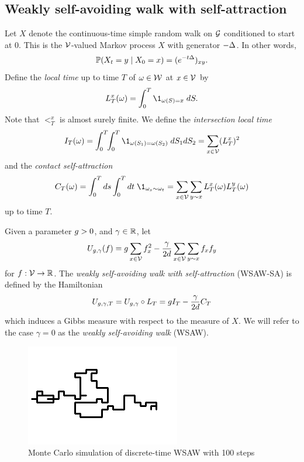 
\subsection{Weakly self-avoiding walk with self-attraction}

Let $X$ denote the continuous-time simple random walk on $\mathcal{G}$ conditioned
to start at $0$. This is the $\mathcal{V}$-valued Markov process $X$ with generator
$-\Delta$. In other words,
\begin{equation}
\operatorname{\mathbb{P}}(X_t = y \mid X_0 = x) = (e^{-t \Delta})_{xy}.
\end{equation}
Define the \emph{local time} up to time $T$ of $\omega \in \mathcal{W}$ at
$x \in \mathcal{V}$ by
\begin{equation}
\label{e:LTx-def}
\lt^x_T(\omega) = \int_0^T \1_{\omega(S)=x} \; dS.
\end{equation}
Note that $\lt^x_T$ is almost surely finite. We define the \emph{intersection
local time}
\begin{equation}
\label{e:ITdef}
I_T(\omega)
	=
\int_0^T \!\! \int_0^T \1_{\omega(S_1)=\omega(S_2)} \; dS_1 dS_2
	=
\sum_{x\in\vertices} (\lt^x_T)^2
\end{equation}
and the \emph{contact self-attraction}
\begin{equation}
\label{e:CTdef}
C_T(\omega)
	=
\int_0^T ds \int_0^T dt \; \1_{\omega_s \sim \omega_t}
	=
\sum_{x \in \vertices} \sum_{y \sim x} \lt_T^x(\omega) \lt_T^y(\omega)
\end{equation}
up to time $T$.

Given a parameter $g > 0$, and $\gamma \in {\mathbb R}$, let
\begin{equation}
\label{e:Udef-neg}
U_{g,\gamma}(f)
=
g \sum_{x\in\mathcal{V}} f_x^2
- \frac{\gamma}{2d}
\sum_{x\in\mathcal{V}} \sum_{y \sim x} f_x f_y
\end{equation}
for $f : \mathcal{V} \rightarrow {\mathbb R}$.
The \emph{weakly self-avoiding walk with self-attraction} (WSAW-SA) is defined
by the Hamiltonian
\begin{equation}
\label{e:V}
U_{g,\gamma,T}
	= U_{g,\gamma} \circ L_T
	= g I_T - \frac{\gamma}{2 d} C_T
\end{equation}
which induces a Gibbs measure with respect to the measure of $X$.
We will refer to the case $\gamma = 0$ as the \emph{weakly self-avoiding walk} (WSAW).

\begin{figure}[!htb]
\centering
\label{fig:domb-joyce}
\includegraphics{domb-joyce-black-small.png}
\caption[Discrete WSAW]{Monte Carlo simulation of discrete-time WSAW with 100 steps}
\end{figure}

